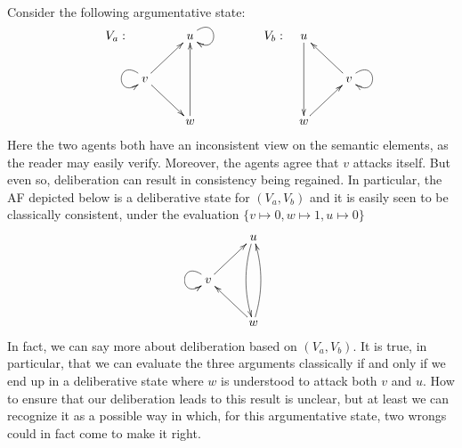 \documentclass[greybox]{svmult}
\begin{document}
\begin{example}\label{ex:wr}
Consider the following argumentative state:
$$
\begin{array}{llll}
V_a: & \xymatrix{ & u \ar@(ru,rd) \\ v \ar[ur] \ar[dr] \ar@(lu,ld) \\ & w \ar[uu] } & \hspace{1.5cm} V_b: & \xymatrix{ u \ar[dd] \\ & v \ar@(ru,rd) \ar[ul] \\ w \ar[ur] }
\end{array}
$$
Here the two agents both have an inconsistent view on the semantic elements, as the reader may easily verify. Moreover, the agents agree that $v$ attacks itself. But even so, deliberation can result in consistency being regained. In particular, the AF depicted below is a deliberative state for $(V_a,V_b)$ and it is easily seen to be classically consistent, under the evaluation $\{v \mapsto 0, w \mapsto 1, u \mapsto 0\}$
$$
\xymatrix{ & u \ar@/_/[dd] \\ v \ar@(lu,ld) \ar[ur] \\ & w \ar[ul] \ar@/_/[uu] }
$$
In fact, we can say more about deliberation based on $(V_a,V_b)$. It is true, in particular, that we can evaluate the three arguments classically if and only if we end up in a deliberative state where $w$ is understood to attack both $v$ and $u$. How to ensure that our deliberation leads to this result is unclear, but at least we can recognize it as a possible way in which, for this argumentative state, two wrongs could in fact come to make it right.

\end{example}
\end{document}
